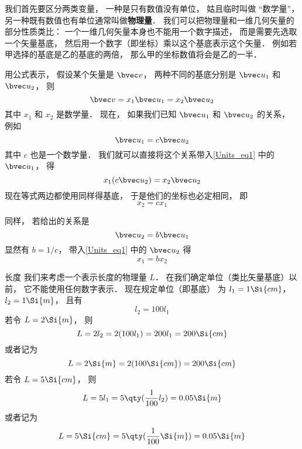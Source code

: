 

我们首先要区分两类变量， 一种是只有数值没有单位， 姑且临时叫做 “数学量”， 另一种既有数值也有单位通常叫做\textbf{物理量}． 我们可以把物理量和一维几何矢量的部分性质类比： 一个一维几何矢量本身也不能用一个数字描述， 而是需要先选取一个矢量基底， 然后用一个数字（即坐标）乘以这个基底表示这个矢量． 例如若甲选择的基底是乙的基底的两倍， 那么甲的坐标数值将会是乙的一半．

用公式表示， 假设某个矢量是 $\bvec v$， 两种不同的基底分别是 $\bvec u_1$ 和 $\bvec u_2$， 则
\begin{equation}\label{Units_eq1}
\bvec v = x_1 \bvec u_1 = x_2 \bvec u_2
\end{equation}
其中 $x_1$ 和 $x_2$ 是数学量． 现在， 如果我们已知 $\bvec u_1$ 和 $\bvec u_2$ 的关系， 例如
\begin{equation}\label{Units_eq2}
\bvec u_1 = c \bvec u_2
\end{equation}
其中 $c$ 也是一个数学量． 我们就可以直接将这个关系带入\autoref{Units_eq1} 中的 $\bvec u_1$， 得
\begin{equation}
x_1 (c \bvec u_2) = x_2 \bvec u_2
\end{equation}
现在等式两边都使用同样得基底， 于是他们的坐标也必定相同， 即
\begin{equation}
x_2 = c x_1
\end{equation}

同样， 若给出的关系是
\begin{equation}
\bvec u_2 = b\bvec u_1
\end{equation}
显然有 $b = 1/c$， 带入\autoref{Units_eq1} 中的 $\bvec u_2$ 得
\begin{equation}
x_1 = b x_2
\end{equation}

\begin{example}{长度}
我们来考虑一个表示长度的物理量 $L$． 在我们确定单位（类比矢量基底）以前， 它不能使用任何数字表示． 现在规定单位（即基底） 为 $l_1 = 1\Si{cm}$， $l_2 = 1\Si{m}$， 且有
\begin{equation}
l_2 = 100 l_1
\end{equation}
若令 $L = 2\Si{m}$， 则
\begin{equation}
L = 2 l_2 = 2 (100 l_1) = 200 l_1 = 200 \Si{cm}
\end{equation}
或者记为
\begin{equation}
L = 2 \Si{m} = 2 (100 \Si{cm}) = 200 \Si{cm}
\end{equation}
若令 $L = 5\Si{cm}$， 则
\begin{equation}
L = 5 l_1 = 5 \qty(\frac{1}{100} l_2) = 0.05 \Si{m}
\end{equation}
或者记为
\begin{equation}
L = 5 \Si{cm} = 5 \qty(\frac{1}{100} \Si{m}) = 0.05 \Si{m}
\end{equation}
\end{example}
